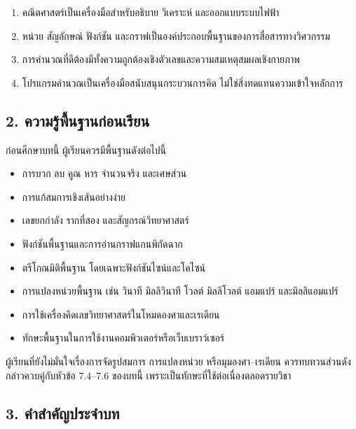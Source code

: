 \begin{enumerate}
    \item คณิตศาสตร์เป็นเครื่องมือสำหรับอธิบาย วิเคราะห์ และออกแบบระบบไฟฟ้า
    \item หน่วย สัญลักษณ์ ฟังก์ชัน และกราฟเป็นองค์ประกอบพื้นฐานของการสื่อสารทางวิศวกรรม
    \item การคำนวณที่ดีต้องมีทั้งความถูกต้องเชิงตัวเลขและความสมเหตุสมผลเชิงกายภาพ
    \item โปรแกรมคำนวณเป็นเครื่องมือสนับสนุนกระบวนการคิด ไม่ใช่สิ่งทดแทนความเข้าใจหลักการ
\end{enumerate}



\subsection{2. ความรู้พื้นฐานก่อนเรียน}

ก่อนศึกษาบทนี้ ผู้เรียนควรมีพื้นฐานดังต่อไปนี้

\begin{itemize}
    \item การบวก ลบ คูณ หาร จำนวนจริง และเศษส่วน
    \item การแก้สมการเชิงเส้นอย่างง่าย
    \item เลขยกกำลัง รากที่สอง และสัญกรณ์วิทยาศาสตร์
    \item ฟังก์ชันพื้นฐานและการอ่านกราฟแกนพิกัดฉาก
    \item ตรีโกณมิติพื้นฐาน โดยเฉพาะฟังก์ชันไซน์และโคไซน์
    \item การแปลงหน่วยพื้นฐาน เช่น วินาที มิลลิวินาที โวลต์ มิลลิโวลต์ แอมแปร์ และมิลลิแอมแปร์
    \item การใช้เครื่องคิดเลขวิทยาศาสตร์ในโหมดองศาและเรเดียน
    \item ทักษะพื้นฐานในการใช้งานคอมพิวเตอร์หรือเว็บเบราว์เซอร์
\end{itemize}

ผู้เรียนที่ยังไม่มั่นใจเรื่องการจัดรูปสมการ การแปลงหน่วย หรือมุมองศา–เรเดียน ควรทบทวนส่วนดังกล่าวควบคู่กับหัวข้อ 7.4–7.6 ของบทนี้ เพราะเป็นทักษะที่ใช้ต่อเนื่องตลอดรายวิชา

\subsection{3. คำสำคัญประจำบท}

